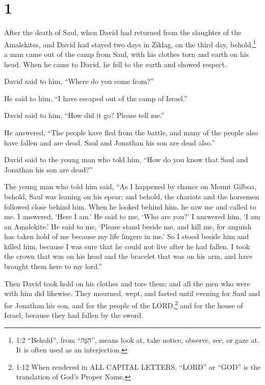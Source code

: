 \hypertarget{section}{%
\section{1}\label{section}}

 After the death of Saul, when David had returned from the
slaughter of the Amalekites, and David had stayed two days in Ziklag,
 on the third day, behold,\footnote{1:2 ``Behold'', from
  ``הִנֵּה'', means look at, take notice, observe, see, or gaze at. It
  is often used as an interjection.} a man came out of the camp from
Saul, with his clothes torn and earth on his head. When he came to
David, he fell to the earth and showed respect.

 David said to him, ``Where do you come from?''

He said to him, ``I have escaped out of the camp of Israel.''

 David said to him, ``How did it go? Please tell me.''

He answered, ``The people have fled from the battle, and many of the
people also have fallen and are dead. Saul and Jonathan his son are dead
also.''

 David said to the young man who told him, ``How do you know
that Saul and Jonathan his son are dead?''

 The young man who told him said, ``As I happened by chance
on Mount Gilboa, behold, Saul was leaning on his spear; and behold, the
chariots and the horsemen followed close behind him.  When
he looked behind him, he saw me and called to me. I answered, `Here I
am.'  He said to me, `Who are you?' I answered him, `I am an
Amalekite.'  He said to me, `Please stand beside me, and
kill me, for anguish has taken hold of me because my life lingers in
me.'  So I stood beside him and killed him, because I was
sure that he could not live after he had fallen. I took the crown that
was on his head and the bracelet that was on his arm, and have brought
them here to my lord.''

 Then David took hold on his clothes and tore them; and all
the men who were with him did likewise.  They mourned,
wept, and fasted until evening for Saul and for Jonathan his son, and
for the people of the LORD,\footnote{1:12 When rendered in ALL CAPITAL
  LETTERS, ``LORD'' or ``GOD'' is the translation of God's Proper Name.}
and for the house of Israel, because they had fallen by the sword.

